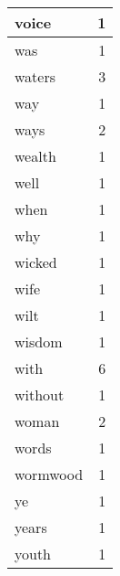 \begin{center}
\begin{longtable}{l|r}
voice & 1\\ \hline 
was & 1\\ \hline 
waters & 3\\ \hline 
way & 1\\ \hline 
ways & 2\\ \hline 
wealth & 1\\ \hline 
well & 1\\ \hline 
when & 1\\ \hline 
why & 1\\ \hline 
wicked & 1\\ \hline 
wife & 1\\ \hline 
wilt & 1\\ \hline 
wisdom & 1\\ \hline 
with & 6\\ \hline 
without & 1\\ \hline 
woman & 2\\ \hline 
words & 1\\ \hline 
wormwood & 1\\ \hline 
ye & 1\\ \hline 
years & 1\\ \hline 
youth & 1\\ \hline 
\end{longtable}  
\end{center}  


  
\normalsize  

  
  
